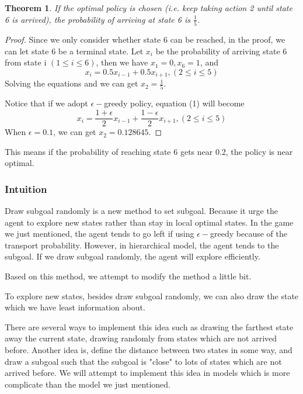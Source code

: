 \documentclass{article}
\newtheorem{theorem}{Theorem}
\begin{document}
\begin{spacing}{1.1}
    \begin{theorem}
        If the optimal policy is chosen (i.e. keep taking action 2 until state 6 is arrived), the probability of arriving at state 6 is $\frac{1}{5}$.
        \end{theorem}
        \begin{proof}
            Since we only consider whether state 6 can be reached, in the proof, we can let state 6 be a terminal state. Let $x_i$ be the probability of arriving state 6 from state i $(1\leq i \leq 6)$, then we have $x_1 = 0, x_6 = 1$, and
            \begin{equation}
                x_i = 0.5x_{i-1} + 0.5x_{i+1}, (2\leq i \leq 5)
            \end{equation}
            Solving the equations and we can get $x_2 = \frac{1}{5}$.

            Notice that if we adopt $\epsilon -$greedy policy, equation (1) will become
            \begin{equation}
                x_i = \frac{1 + \epsilon}{2}x_{i-1} + \frac{1 - \epsilon}{2}x_{i+1}, (2\leq i \leq 5)
            \end{equation}
            When $\epsilon = 0.1$, we can get $x_2 = 0.128645$.
        \end{proof}

    This means if the probability of reaching state 6 gets near 0.2, the policy is near optimal.
    \subsubsection{Intuition}

    Draw subgoal randomly is a new method to set subgoal. Because it urge the agent to explore new states rather than stay in local optimal states. In the game we just mentioned, the agent tends to go left if using $\epsilon-$greedy because of the transport probability. However, in hierarchical model, the agent tends to the subgoal. If we draw subgoal randomly, the agent will explore efficiently.

    Based on this method, we attempt to modify the method a little bit.

    To explore new states, besides draw subgoal randomly, we can also draw the state which we have least information about.

    There are several ways to implement this idea such as drawing the farthest state away the current state, drawing randomly from states which are not arrived before. Another idea is, define the distance between two states in some way, and draw a subgoal such that the subgoal is "close" to lots of states which are not arrived before. We will attempt to implement this idea in models which is more complicate than the model we just mentioned.


\end{spacing}
\end{document}
